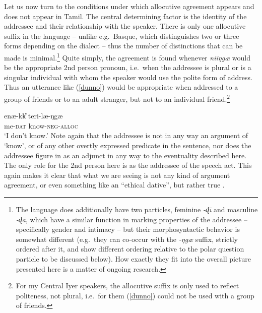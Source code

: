 \documentclass[output=paper, modfonts, nonflat]{langsci/langscibook}
\begin{document}
Let us now turn to the conditions under which allocutive agreement
appears and does not appear in Tamil.
The central determining factor is the identity of the addressee and
their relationship with the speaker. There is only one allocutive
suffix in the language -- unlike e.g.\ Basque, which distinguishes
two or three forms depending on the dialect -- thus the number of
distinctions that can be made is minimal.\footnote{The language does
  additionally have two particles, feminine \textit{-ɖ\=\i} and
  masculine \textit{-ɖ\=a}, which have a similar function in marking
  properties of the addressee -- specifically gender and intimacy --
  but their morphosyntactic behavior is somewhat different (e.g.\ they
  can co-occur with the \textit{-ŋgæ} suffix, strictly ordered after
  it, and show different ordering relative to the polar question
  particle to be discussed below). How exactly they fit into the
  overall picture presented here is a matter of ongoing research.}
Quite simply, the agreement is found whenever \textit{niiŋgæ}
would be the appropriate 2nd person pronoun, i.e.\ when the addressee
is plural or is a singular individual with whom the speaker would use
the polite form of address. Thus an utterance like (\ref{dunno}) would
be appropriate when addressed to a group of friends or to an adult
stranger, but not to an individual friend.\footnote{For my Central
  Iyer speakers, the allocutive suffix is only used to reflect
  politeness, not plural, i.e.\ for them (\ref{dunno}) could not be
  used with a group of friends.} 

\ea\label{dunno}\gll enæ-kk\U{} teri-læ-ŋgæ\\
me-\textsc{dat}{} know-\textsc{neg}-\textsc{alloc}\\
\glt `I don't know.'
\z
%
Note again that the addressee is not in any way an argument of `know',
or of any other overtly expressed predicate in the sentence, nor does
the addressee figure in as an adjunct in any way to the eventuality
described here. The only role for the 2nd person here is as the
addressee of the speech act. This again makes it clear that what we
are seeing is not any kind of argument agreement, or even something
like an ``ethical dative'', but rather true \allagr.

\end{document}
